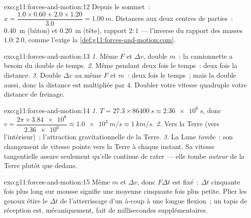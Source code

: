 \begin{solution}{exo:g11:forces-and-motion:12}
Depuis le sommet~: $x = \dfrac{1.0 \times 0.60 + 2.0 \times 1.20}{3.0}
= \qty{1.00}{m}$. Distances aux deux centres de parties~: \qty{0.40}{m}
(bâton) et \qty{0.20}{m} (tête), rapport $2 : 1$ --- l'inverse du
rapport des masses $1.0 : 2.0$, comme l'exige la
\cref{def:g11:forces-and-motion:com}.
\end{solution}

\begin{solution}{exo:g11:forces-and-motion:13}
\emph{1.} Même $F$ et $\Delta v$, double $m$~: la camionnette a besoin
du double de temps. \emph{2.} Même
 pendant deux fois le
temps~: deux fois la distance. \emph{3.} Double $\Delta v$ au même $F$
et $m$~: deux fois le temps~; mais la
 double aussi, donc la
distance est multipliée par $4$. Doubler votre vitesse quadruple votre
distance de freinage.
\end{solution}

\begin{solution}{exo:g11:forces-and-motion:14}
\emph{1.} $T = 27.3 \times \qty{86400}{s} \approx \qty{2.36e6}{s}$, donc
$v = \dfrac{2\pi \times \num{3.84e8}}{\num{2.36e6}} \approx
\qty{1.0e3}{m/s} \approx \qty{1}{km/s}$. \emph{2.} Vers la Terre
(vers l'intérieur)~; l'attraction gravitationnelle de la Terre.
\emph{3.} La Lune \emph{tombe}~: son changement de vitesse pointe vers
la Terre à chaque instant. Sa vitesse tangentielle assure seulement
qu'elle continue de rater --- elle tombe \emph{autour} de la Terre
plutôt que dedans.
\end{solution}

\begin{solution}{exo:g11:forces-and-motion:15}
Même $m$ et $\Delta v$, donc $F\Delta t$ est fixé~: $\Delta t$
cinquante fois plus long sur mousse signifie une
 moyenne cinquante fois plus petite.
Plier les genoux étire le $\Delta t$ de l'atterrissage d'un à-coup à
une longue flexion~; un tapis de réception est, mécaniquement, fait de
millisecondes supplémentaires.
\end{solution}

